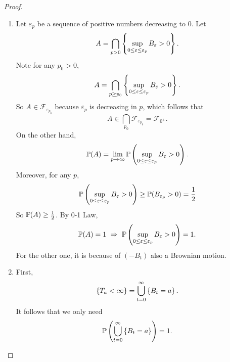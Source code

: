 \begin{proof}
    \begin{enumerate}[label=(\arabic{*})]
        \item Let $\varepsilon_p$ be a sequence of positive numbers decreasing to $0$. Let
        \begin{equation*}
            A = \bigcap_{p > 0}\left\{\sup_{0 \leq \varepsilon \leq \varepsilon_p} B_\varepsilon > 0\right\}.
        \end{equation*}
        Note for any $p_0 > 0$,
        \begin{equation*}
            A = \bigcap_{p \geq p_0}\left\{\sup_{0 \leq \varepsilon \leq \varepsilon_p} B_\varepsilon > 0\right\}.
        \end{equation*}
        So $A \in \mathcal{F}_{\varepsilon_{p_0}}$ because $\varepsilon_p$ is decreasing in $p$, which follows that
        \begin{equation*}
            A \in \bigcap_{p_0}\mathcal{F}_{\varepsilon_{p_0}} = \mathcal{F}_{0^+}.
        \end{equation*}
        On the other hand,
        \begin{equation*}
            \mathbb{P}(A) = \lim_{p \rightarrow \infty} \mathbb{P}\left(\sup_{0 \leq \varepsilon \leq \varepsilon_p} B_\varepsilon > 0\right).
        \end{equation*}
        Moreover, for any $p$,
        \begin{equation*}
            \mathbb{P}\left(\sup_{0 \leq \varepsilon \leq \varepsilon_p} B_\varepsilon > 0\right) \geq \mathbb{P}(B_{\varepsilon_p} > 0) = \frac{1}{2}
        \end{equation*}
        So $\mathbb{P}(A) \geq \frac{1}{2}$. By 0-1 Law,
        \begin{equation*}
            \mathbb{P}(A) = 1~\Rightarrow~ \mathbb{P}\left(\sup_{0 \leq \varepsilon \leq \varepsilon_p} B_\varepsilon > 0\right) = 1.
        \end{equation*}
        For the other one, it is because of $(-B_t)$ also a Brownian motion.

        \item First,
        \begin{equation*}
            \left\{T_a < \infty\right\} = \bigcup_{t=0}^\infty \left\{B_t = a\right\}.
        \end{equation*}
        It follows that we only need
        \begin{equation*}
            \mathbb{P}\left(\bigcup_{t=0}^\infty \left\{B_t = a\right\}\right) = 1.
        \end{equation*}
        

\end{enumerate}
\end{proof}
